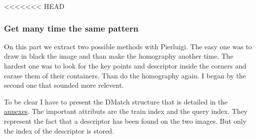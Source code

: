 \documentclass[english,a4paper,11pt]{report}
\begin{document}
	
	
	\setcounter{secnumdepth}{2}
	\setcounter{tocdepth}{2}
	
	\tableofcontents
	\newpage
	
	\setcounter{page}{1}
	
	
	
	
	
	
	
	
	
	
	
	
<<<<<<< HEAD
	\subsubsection[Multiple pattern]{Get many time the same pattern}

	\par On this part we extract two possible methods with Pierluigi. The easy one was to draw in black the image and than make the homography another time. The hardest one was to look for the key points and descriptor inside the corners and earase them of their containers. Than do the homography again. I began by the second one that sounded more relevent. 
	
	\par To be clear I have to present the DMatch structure that is detailed in the \hyperlink{structDMatch}{annexes}. The important attributs are the train index and the query index. They represent the fact that a descriptor has been found on the two images. But only the index of the descriptor is stored.
	
\end{document}
